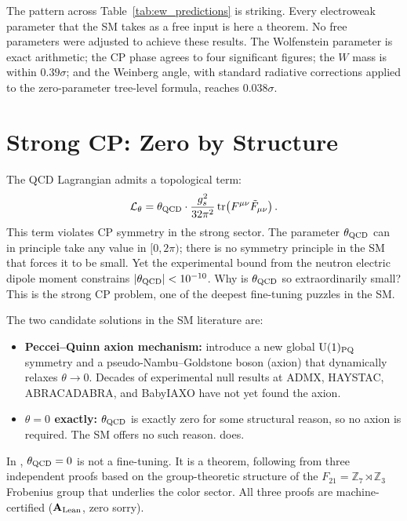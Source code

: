 \documentclass[11pt,openany]{book}
\theoremstyle{remark}
\newcommand{\GTE}{\text{GTE}}
\newcommand{\ZS}{\mathbb{Z}_7}
\newcommand{\CatAL}{\ensuremath{\textbf{A}_{\rm Lean}}}
\begin{document}
The pattern across Table~\ref{tab:ew_predictions} is striking.  Every electroweak
parameter that the SM takes as a free input is here a theorem.  No free parameters were
adjusted to achieve these results.  The Wolfenstein parameter is exact arithmetic; the
CP phase agrees to four significant figures; the $W$ mass is within $0.39\sigma$; and the
Weinberg angle, with standard radiative corrections applied to the zero-parameter
tree-level formula, reaches $0.038\sigma$.

\section{Strong CP: Zero by Structure}
\label{sec:strong_cp}

The QCD Lagrangian admits a topological term:
\begin{equation}
  \mathcal{L}_{\theta} = \theta_{\rm QCD}
  \cdot \frac{g_s^2}{32\pi^2} \,
  \mathrm{tr}\!\left(F^{\mu\nu}\tilde{F}_{\mu\nu}\right).
  \label{eq:theta_term}
\end{equation}
This term violates CP symmetry in the strong sector.  The parameter $\theta_{\rm QCD}$
can in principle take any value in $[0, 2\pi)$; there is no symmetry principle in the SM
that forces it to be small.  Yet the experimental bound from the neutron electric dipole
moment constrains $|\theta_{\rm QCD}| < 10^{-10}$.  Why is $\theta_{\rm QCD}$ so
extraordinarily small?  This is the strong CP problem, one of the deepest fine-tuning
puzzles in the SM.

The two candidate solutions in the SM literature are:
\begin{itemize}
\item \textbf{Peccei--Quinn axion mechanism:} introduce a new global $\mathrm{U}(1)_{\rm PQ}$
  symmetry and a pseudo-Nambu--Goldstone boson (axion) that dynamically relaxes $\theta \to 0$.
  Decades of experimental null results at ADMX, HAYSTAC, ABRACADABRA, and BabyIAXO have
  not yet found the axion.
\item \textbf{$\theta = 0$ exactly:} $\theta_{\rm QCD}$ is exactly zero for some structural
  reason, so no axion is required.  The SM offers no such reason.  \GTE{} does.
\end{itemize}

In \GTE{}, $\theta_{\rm QCD} = 0$ is not a fine-tuning.  It is a theorem, following from
three independent proofs based on the group-theoretic structure of the $F_{21} = \ZS
\rtimes \mathbb{Z}_3$ Frobenius group that underlies the \GTE{} color sector.  All three
proofs are machine-certified (\CatAL{}, zero sorry).
\end{document}
